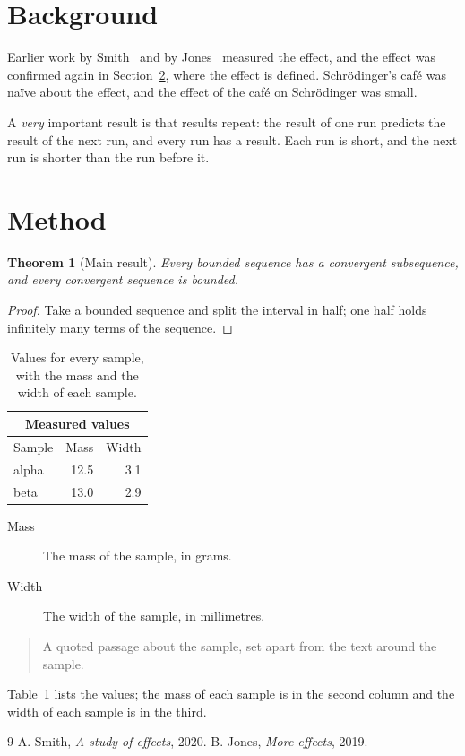 \documentclass[twocolumn]{article}
\newtheorem{theorem}{Theorem}
\begin{document}
\section{Background}

Earlier work by Smith~\cite{smith2020} and by Jones~\cite[p.~4]{jones2019} measured the effect, and the effect was confirmed again in Section~\ref{sec:method}, where the effect is defined. Schrödinger's café was naïve about the effect, and the effect of the café on Schrödinger was small.

A \emph{very} important result is that results repeat: the result of one run predicts the result of the next run, and every run has a result. Each run is short, and the next run is shorter than the run before it.

\section{Method}\label{sec:method}

\begin{theorem}[Main result]
Every bounded sequence has a convergent subsequence, and every convergent sequence is bounded.
\end{theorem}

\begin{proof}
Take a bounded sequence and split the interval in half; one half holds infinitely many terms of the sequence.
\end{proof}

\begin{table}[t]
  \centering
  \begin{tabular}{@{}lrr@{}}
    \toprule
    \multicolumn{3}{c}{Measured values} \\
    \midrule
    Sample & Mass & Width \\
    alpha & 12.5 & 3.1 \\
    beta & 13.0 & 2.9 \\
    \bottomrule
  \end{tabular}
  \caption{Values for every sample, with the mass and the width of each sample.}
  \label{tab:values}
\end{table}

\begin{description}
  \item[Mass] The mass of the sample, in grams.
  \item[Width] The width of the sample, in millimetres.
\end{description}

\begin{quote}
A quoted passage about the sample, set apart from the text around the sample.
\end{quote}

Table~\ref{tab:values} lists the values; the mass of each sample is in the second column and the width of each sample is in the third.

\begin{thebibliography}{9}
 A. Smith, \emph{A study of effects}, 2020.
 B. Jones, \emph{More effects}, 2019.
\end{thebibliography}
\end{document}
